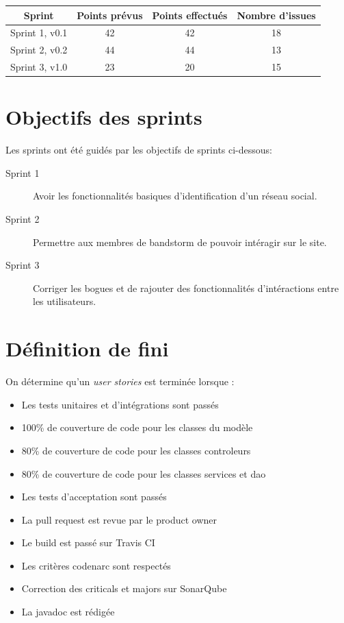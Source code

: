 \documentclass[12pt,a4paper,oneside]{book}
\begin{document}
	\begin{tabular}{|c|c|c|c|}
		\hline
		\textbf{Sprint} &\textbf{ Points prévus} & \textbf{Points effectués }&\textbf{ Nombre d'issues}\\
		\hline
		Sprint 1, v0.1 &42& 42& 18\\
		\hline
		Sprint 2, v0.2 &44& 44& 13\\
		\hline
		Sprint 3, v1.0 &23& 20& 15\\
		\hline
	\end{tabular}
	\section{Objectifs des sprints}
	Les sprints ont été guidés par les objectifs de sprints ci-dessous:

\begin{description}
	\item[Sprint 1] Avoir les fonctionnalités basiques d’identification d’un réseau social. 
	\item[Sprint 2] Permettre aux membres de bandstorm de pouvoir intéragir sur le site.
	\item[Sprint 3] Corriger les bogues et de rajouter des fonctionnalités d'intéractions entre les utilisateurs. 
\end{description}

	\section{Définition de fini}
	On détermine qu'un \textit{user stories} est terminée lorsque : 

	\begin{itemize}
		\item Les tests unitaires et d’intégrations sont passés
		\item 100\% de couverture de code pour les classes du modèle
		\item 80\% de couverture de code pour les classes controleurs
		\item 80\% de couverture de code pour les classes services et dao
		\item Les tests d’acceptation sont passés
		\item La pull request est revue par le product owner
		\item Le build est passé sur Travis CI
		\item Les critères codenarc sont respectés 
		\item Correction des criticals et majors sur SonarQube
		\item La javadoc est rédigée 
	\end{itemize}
\end{document}
